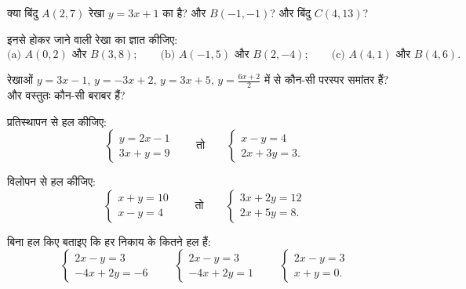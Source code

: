 \begin{exercise}[$\star$]\label{exo:g10:lines:2}
क्या बिंदु $A(2, 7)$ रेखा $y = 3x + 1$ का है? और $B(-1, -1)$? और बिंदु $C(4, 13)$?
\end{exercise}

\begin{exercise}[$\star$]\label{exo:g10:lines:3}
इनसे होकर जाने वाली रेखा का  ज्ञात कीजिए:
\[
\text{(a) } A(0, 2) \text{ और } B(3, 8);
\qquad
\text{(b) } A(-1, 5) \text{ और } B(2, -4);
\qquad
\text{(c) } A(4, 1) \text{ और } B(4, 6).
\]
\end{exercise}

\begin{exercise}[$\star$]\label{exo:g10:lines:4}
रेखाओं $y = 3x - 1$, $y = -3x + 2$, $y = 3x + 5$, $y = \frac{6x + 2}{2}$ में से कौन-सी परस्पर समांतर हैं? और
वस्तुतः कौन-सी बराबर हैं?
\end{exercise}

\begin{exercise}[$\star$]\label{exo:g10:lines:5}
प्रतिस्थापन से हल कीजिए:
\[
\begin{cases}
y = 2x - 1 \\
3x + y = 9
\end{cases}
\qquad\text{तो}\qquad
\begin{cases}
x - y = 4 \\
2x + 3y = 3 .
\end{cases}
\]
\end{exercise}

\begin{exercise}[$\star$]\label{exo:g10:lines:6}
विलोपन से हल कीजिए:
\[
\begin{cases}
x + y = 10 \\
x - y = 4
\end{cases}
\qquad\text{तो}\qquad
\begin{cases}
3x + 2y = 12 \\
2x + 5y = 8 .
\end{cases}
\]
\end{exercise}

\begin{exercise}[$\star\star$]\label{exo:g10:lines:7}
बिना हल किए बताइए कि हर निकाय के कितने हल हैं:
\[
\begin{cases}
2x - y = 3 \\
-4x + 2y = -6
\end{cases}
\qquad
\begin{cases}
2x - y = 3 \\
-4x + 2y = 1
\end{cases}
\qquad
\begin{cases}
2x - y = 3 \\
x + y = 0 .
\end{cases}
\]
\end{exercise}

